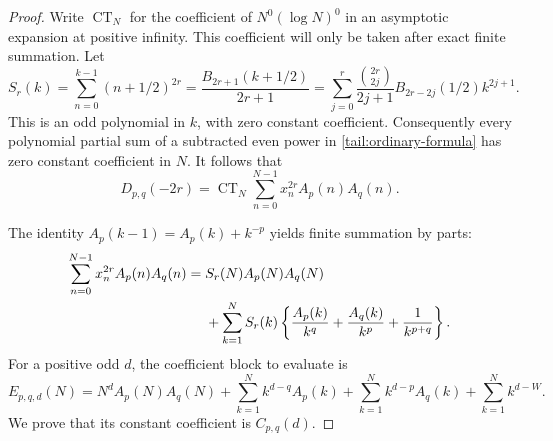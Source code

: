 \documentclass[11pt,a4paper]{article}
\numberwithin{equation}{section}
\theoremstyle{definition}
\theoremstyle{remark}
\begin{document}
\begin{proof}
Write \(\operatorname{CT}_N\) for the coefficient of
\(N^0(\log N)^0\) in an asymptotic expansion at positive infinity.
This coefficient will only be taken after exact finite summation.
Let
\begin{equation}\label{tail:S}
 S_r(k)=\sum_{n=0}^{k-1}(n+1/2)^{2r}
       =\frac{B_{2r+1}(k+1/2)}{2r+1}
       =\sum_{j=0}^{r}
         \frac{\binom{2r}{2j}}{2j+1}
         B_{2r-2j}(1/2)k^{2j+1}.
\end{equation}
This is an odd polynomial in \(k\), with zero constant coefficient.
Consequently every polynomial partial sum of a subtracted even power
in \eqref{tail:ordinary-formula} has zero constant coefficient in
\(N\). It follows that
\begin{equation}\label{tail:CT-moment}
 D_{p,q}(-2r)=\operatorname{CT}_N
              \sum_{n=0}^{N-1}x_n^{2r}A_p(n)A_q(n).
\end{equation}

The identity \(A_p(k-1)=A_p(k)+k^{-p}\) yields finite summation by
parts:
\begin{align}\label{tail:finite-summation}
 \sum_{n=0}^{N-1}x_n^{2r}A_p(n)A_q(n)
 ={}&S_r(N)A_p(N)A_q(N)\notag\\
 &+\sum_{k=1}^{N}S_r(k)
  \left\{\frac{A_p(k)}{k^q}+\frac{A_q(k)}{k^p}
                     +\frac1{k^{p+q}}\right\}.
\end{align}
For a positive odd \(d\), the coefficient block to evaluate is
\begin{equation}\label{tail:E}
 E_{p,q,d}(N)=N^dA_p(N)A_q(N)
 +\sum_{k=1}^{N}k^{d-q}A_p(k)
 +\sum_{k=1}^{N}k^{d-p}A_q(k)
 +\sum_{k=1}^{N}k^{d-W}.
\end{equation}
We prove that its constant coefficient is \(C_{p,q}(d)\).


\end{proof}
\end{document}
